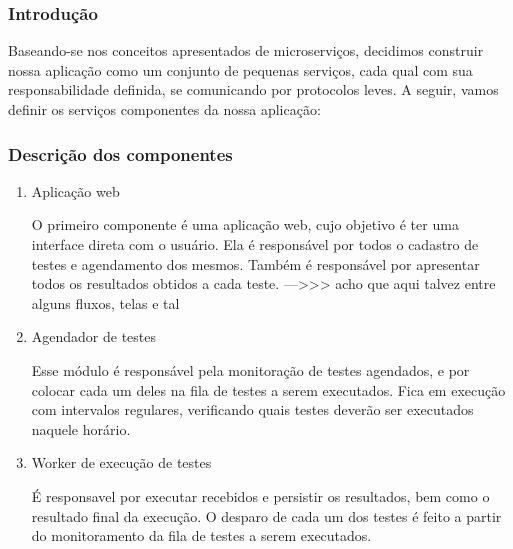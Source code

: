 \subsubsection{Introdução}\label{sec:LABEL_CHP_4_SEC_B_SEC_B_SEC_A}
    
    Baseando-se nos conceitos apresentados de microserviços, decidimos construir nossa aplicação como um conjunto de pequenas serviços, cada qual com sua responsabilidade definida, se comunicando por protocolos leves.
    A seguir, vamos definir os serviços componentes da nossa aplicação:
    
    
\subsubsection{Descrição dos componentes}\label{sec:LABEL_CHP_4_SEC_B_SEC_B_SEC_B}

\begin{enumerate}

\item Aplicação web

    O primeiro componente é uma aplicação web, cujo objetivo é ter uma interface direta com o usuário. Ela é responsável por todos o cadastro de testes e agendamento dos mesmos. Também é responsável por apresentar todos os resultados obtidos a cada teste.
    --->>> acho que aqui talvez entre alguns fluxos, telas e tal
    
\item {Agendador de testes}

    Esse módulo é responsável pela monitoração de testes agendados, e por colocar cada um deles na fila de testes a serem executados. Fica em execução com intervalos regulares, verificando quais testes deverão ser executados naquele horário.  

\item {Worker de execução de testes}

    É responsavel por  executar recebidos e persistir os resultados, bem como o resultado final da execução. O desparo de cada um dos testes é feito a partir do monitoramento da fila de testes a serem executados.
    
\end{enumerate}

